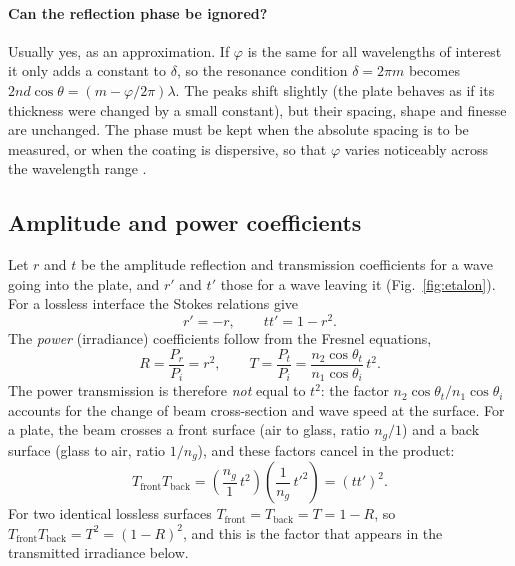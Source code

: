 \documentclass[11pt,a4paper]{article}
\begin{document}
	
	
	\paragraph{Can the reflection phase be ignored?} Usually yes, as an approximation. If $\varphi$ is the same for all wavelengths of interest it only adds a constant to $\delta$, so the resonance condition $\delta=2\pi m$ becomes $2nd\cos\theta=(m-\varphi/2\pi)\lambda$. The peaks shift slightly (the plate behaves as if its thickness were changed by a small constant), but their spacing, shape and finesse are unchanged. The phase must be kept when the absolute spacing is to be measured, or when the coating is dispersive, so that $\varphi$ varies noticeably across the wavelength range \cite{BornWolf,Vaughan}.
	
	\subsection{Amplitude and power coefficients}
	
	Let $r$ and $t$ be the amplitude reflection and transmission coefficients for a wave going into the plate, and $r'$ and $t'$ those for a wave leaving it (Fig.~\ref{fig:etalon}). For a lossless interface the Stokes relations give
	\begin{equation}
		r'=-r, \qquad tt'=1-r^2 .
	\end{equation}
	The \emph{power} (irradiance) coefficients follow from the Fresnel equations,
	\begin{equation}
		R=\frac{P_r}{P_i}=r^2, \qquad T=\frac{P_t}{P_i}=\frac{n_2\cos\theta_t}{n_1\cos\theta_i}\,t^2 .
		\label{eq:RT}
	\end{equation}
	The power transmission is therefore \emph{not} equal to $t^2$: the factor $n_2\cos\theta_t/n_1\cos\theta_i$ accounts for the change of beam cross-section and wave speed at the surface. For a plate, the beam crosses a front surface (air to glass, ratio $n_g/1$) and a back surface (glass to air, ratio $1/n_g$), and these factors cancel in the product:
	\begin{equation}
		T_{\mathrm{front}}T_{\mathrm{back}}=\left(\frac{n_g}{1}\,t^2\right)\left(\frac{1}{n_g}\,t'^2\right)=(tt')^2 .
	\end{equation}
	For two identical lossless surfaces $T_{\mathrm{front}}=T_{\mathrm{back}}=T=1-R$, so $T_{\mathrm{front}}T_{\mathrm{back}}=T^2=(1-R)^2$, and this is the factor that appears in the transmitted irradiance below.
	
\end{document}
